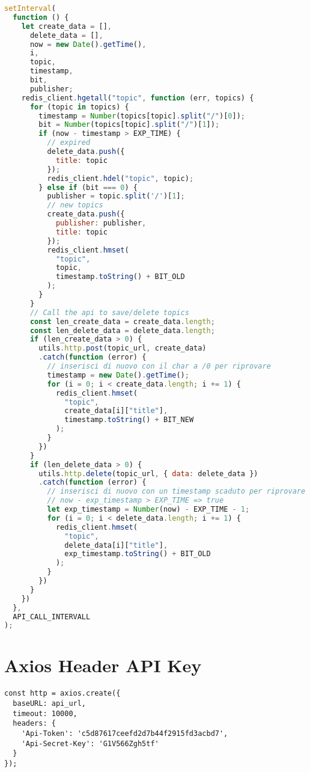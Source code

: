 \begin{lstlisting}[language=javascript, caption={topic.js}, label={lst:topic}]
setInterval(
  function () {
    let create_data = [],
      delete_data = [],
      now = new Date().getTime(),
      i,
      topic,
      timestamp,
      bit,
      publisher;
    redis_client.hgetall("topic", function (err, topics) {
      for (topic in topics) {
        timestamp = Number(topics[topic].split("/")[0]);
        bit = Number(topics[topic].split("/")[1]);
        if (now - timestamp > EXP_TIME) {
          // expired
          delete_data.push({
            title: topic
          });
          redis_client.hdel("topic", topic);
        } else if (bit === 0) {
          publisher = topic.split('/')[1];
          // new topics
          create_data.push({
            publisher: publisher,
            title: topic
          });
          redis_client.hmset(
            "topic",
            topic,
            timestamp.toString() + BIT_OLD
          );
        }
      }
      // Call the api to save/delete topics
      const len_create_data = create_data.length;
      const len_delete_data = delete_data.length;
      if (len_create_data > 0) {
        utils.http.post(topic_url, create_data)
        .catch(function (error) {
          // inserisci di nuovo con il char a /0 per riprovare
          timestamp = new Date().getTime();
          for (i = 0; i < create_data.length; i += 1) {
            redis_client.hmset(
              "topic",
              create_data[i]["title"],
              timestamp.toString() + BIT_NEW
            );
          }
        })
      }
      if (len_delete_data > 0) {
        utils.http.delete(topic_url, { data: delete_data })
        .catch(function (error) {
          // inserisci di nuovo con un timestamp scaduto per riprovare
          // now - exp_timestamp > EXP_TIME => true
          let exp_timestamp = Number(now) - EXP_TIME - 1;
          for (i = 0; i < delete_data.length; i += 1) {
            redis_client.hmset(
              "topic",
              delete_data[i]["title"],
              exp_timestamp.toString() + BIT_OLD
            );
          }
        })
      }
    })
  },
  API_CALL_INTERVALL
);
\end{lstlisting}
\newpage

\section{Axios Header API Key}
\begin{footnotesize}
\begin{verbatim}
const http = axios.create({
  baseURL: api_url,
  timeout: 10000,
  headers: {
    'Api-Token': 'c5d87617ceefd2d7b44f2915fd3acbd7',
    'Api-Secret-Key': 'G1V566Zgh5tf'
  }
});
\end{verbatim}
\end{footnotesize}

